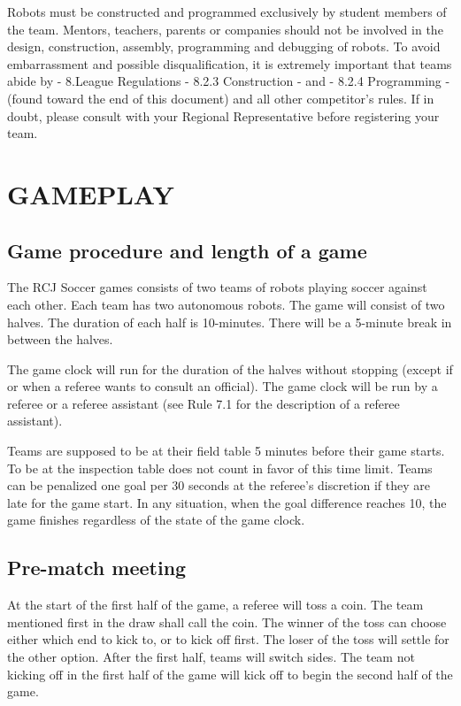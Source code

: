\documentclass{article}
\begin{document}
Robots must be constructed and programmed exclusively by student members of the team. Mentors, teachers, parents or companies should not be involved in the \textcolor{color-5}{design, construction, assembly}, programming and debugging of robots. To avoid embarrassment and possible disqualification, it is extremely important that teams abide by - \textcolor{color-5}{8}.League Regulations - \textcolor{color-5}{8}.2.3 Construction - and - \textcolor{color-5}{8}.2.4 Programming - (found toward the end of this document) and all other competitor's rules. If in doubt, please consult with your Regional Representative before registering your team.

\section{GAMEPLAY \label{ref-001}}

\subsection{Game procedure and length of a game \label{ref-002}}

\textcolor{color-5}{The RCJ Soccer games consists of two teams of robots playing soccer against each other. Each team has two autonomous robots.} The game will consist of two halves. The duration of each half is 10-minutes. There will be a 5-minute break in between the halves.

The game clock will run for the duration of the halves without stopping (except if or when a referee wants to consult an official). The game clock will be run by a referee or a referee assistant (see Rule 7.1 for the description of a referee assistant). 

Teams are supposed to be at their field table 5 minutes before their game starts. To be at the inspection table does not count in favor of this time limit. Teams can be penalized one goal per \textcolor{color-5}{30 seconds} at the referee's discretion if they are late for the game start. \textcolor{color-5}{In any situation, when the goal difference reaches 10, the game finishes regardless of the state of the game clock}.

\subsection{Pre-match meeting \label{ref-003}}

At the start of the first half of the game, a referee will toss a coin. The team mentioned first in the draw shall call the coin. The winner of the toss can choose either which end to kick to, or to kick off first. The loser of the toss will settle for the other option. After the first half, teams will switch sides. The team not kicking off in the first half of the game will kick off to begin the second half of the game. 
\end{document}
